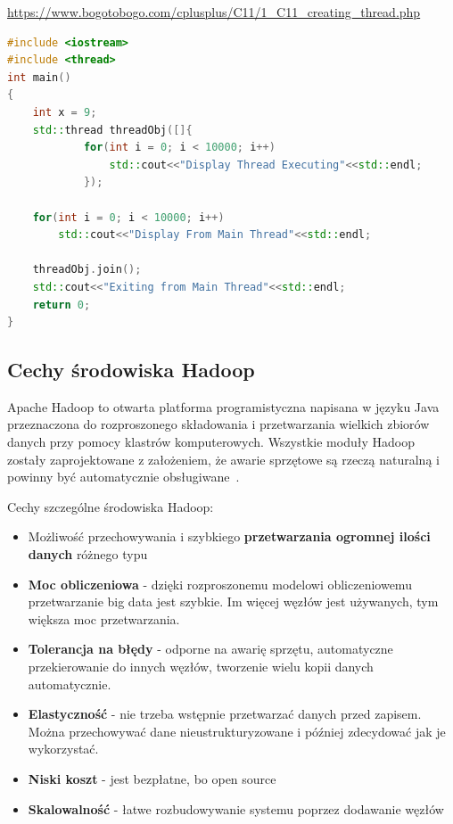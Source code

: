 \documentclass[wi]{zut}
\begin{document}
{\url{https://www.bogotobogo.com/cplusplus/C11/1_C11_creating_thread.php}}{\label{kod:przyklad}}
\begin{lstlisting}[language=C++]
#include <iostream>
#include <thread>
int main()  
{
    int x = 9;
    std::thread threadObj([]{
            for(int i = 0; i < 10000; i++)
                std::cout<<"Display Thread Executing"<<std::endl;
            });
            
    for(int i = 0; i < 10000; i++)
        std::cout<<"Display From Main Thread"<<std::endl;
        
    threadObj.join();
    std::cout<<"Exiting from Main Thread"<<std::endl;
    return 0;
}
\end{lstlisting}

\subsection{Cechy środowiska Hadoop}

Apache Hadoop to otwarta platforma programistyczna napisana w języku Java przeznaczona do rozproszonego składowania i przetwarzania wielkich zbiorów danych przy pomocy klastrów komputerowych. Wszystkie moduły Hadoop zostały zaprojektowane z założeniem, że awarie sprzętowe są rzeczą naturalną i powinny być automatycznie obsługiwane~\cite{Korytkowski_hadoop}.

Cechy szczególne środowiska Hadoop:

\begin{itemize}
    \item Możliwość przechowywania i szybkiego \textbf{przetwarzania ogromnej ilości danych} różnego typu
    \item \textbf{Moc obliczeniowa} - dzięki rozproszonemu modelowi obliczeniowemu przetwarzanie big data jest szybkie. Im więcej węzłów jest używanych, tym większa moc przetwarzania.
    \item \textbf{Tolerancja na błędy} - odporne na awarię sprzętu, automatyczne przekierowanie do innych węzłów, tworzenie wielu kopii danych automatycznie.
    \item \textbf{Elastyczność} - nie trzeba wstępnie przetwarzać danych przed zapisem. Można przechowywać dane nieustrukturyzowane i później zdecydować jak je wykorzystać.
    \item \textbf{Niski koszt} - jest bezpłatne, bo open source
    \item \textbf{Skalowalność} - łatwe rozbudowywanie systemu poprzez dodawanie węzłów
\end{itemize}
\end{document}
